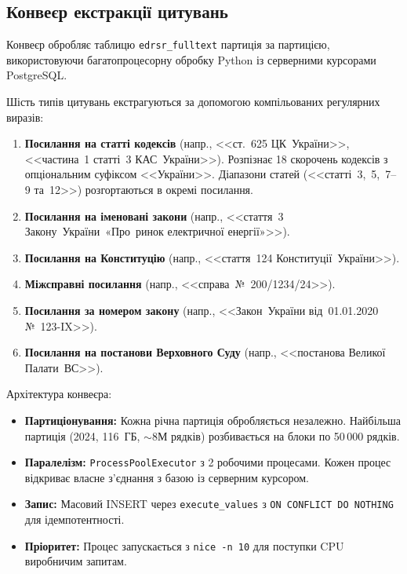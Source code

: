 \documentclass[11pt]{article}
\begin{document}
\subsection{Конвеєр екстракції цитувань}

Конвеєр обробляє таблицю \texttt{edrsr\_fulltext} партиція за партицією, використовуючи багатопроцесорну обробку Python із серверними курсорами PostgreSQL.

Шість типів цитувань екстрагуються за допомогою компільованих регулярних виразів:

\begin{enumerate}[leftmargin=*, nosep]
  \item \textbf{Посилання на статті кодексів} (напр., <<ст.~625 ЦК~України>>, <<частина~1 статті~3 КАС~України>>).
    Розпізнає 18 скорочень кодексів з опціональним суфіксом <<України>>.
    Діапазони статей (<<статті~3,~5,~7--9 та~12>>) розгортаються в окремі посилання.

  \item \textbf{Посилання на іменовані закони} (напр., <<стаття~3 Закону~України~«Про~ринок електричної енергії»>>).

  \item \textbf{Посилання на Конституцію} (напр., <<стаття~124 Конституції~України>>).

  \item \textbf{Міжсправні посилання} (напр., <<справа~№~200/1234/24>>).

  \item \textbf{Посилання за номером закону} (напр., <<Закон~України від~01.01.2020 №~123-IX>>).

  \item \textbf{Посилання на постанови Верховного Суду} (напр., <<постанова Великої Палати~ВС>>).
\end{enumerate}

Архітектура конвеєра:

\begin{itemize}[leftmargin=*, nosep]
  \item \textbf{Партиціонування:} Кожна річна партиція обробляється незалежно. Найбільша партиція (2024, 116~ГБ, ${\sim}$8М рядків) розбивається на блоки по 50\,000 рядків.
  \item \textbf{Паралелізм:} \texttt{ProcessPoolExecutor} з 2 робочими процесами. Кожен процес відкриває власне з'єднання з базою із серверним курсором.
  \item \textbf{Запис:} Масовий INSERT через \texttt{execute\_values} з \texttt{ON CONFLICT DO NOTHING} для ідемпотентності.
  \item \textbf{Пріоритет:} Процес запускається з \texttt{nice~-n~10} для поступки CPU виробничим запитам.
\end{itemize}
\end{document}
